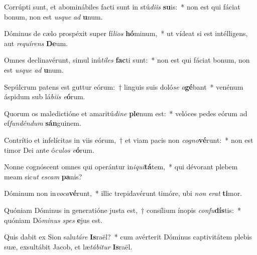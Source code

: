 \item Corrúpti sunt, et abominábiles facti sunt in stú\textit{di}\textit{is} \textbf{su}is:~* non est qui fáciat bonum, non est \textit{us}\textit{que} \textit{ad} \textbf{u}num.
\item Dóminus de cælo prospéxit super fí\textit{li}\textit{os} \textbf{hó}minum,~* ut vídeat si est intélligens, aut \textit{re}\textit{quí}\textit{rens} \textbf{De}um.
\item Omnes declinavérunt, simul inú\textit{ti}\textit{les} \textbf{fac}ti sunt:~* non est qui fáciat bonum, non est \textit{us}\textit{que} \textit{ad} \textbf{u}num.
\item Sepúlcrum patens est guttur eórum:~† linguis suis doló\textit{se} \textit{a}\textbf{gé}bant~* venénum áspidum sub lá\textit{bi}\textit{is} \textit{e}\textbf{ó}rum.
\item Quorum os maledictióne et amaritú\textit{di}\textit{ne} \textbf{ple}num est:~* velóces pedes eórum ad ef\textit{fun}\textit{dén}\textit{dum} \textbf{sán}guinem.
\item Contrítio et infelícitas in viis eórum,~† et viam pacis non \textit{co}\textit{gno}\textbf{vé}runt:~* non est timor Dei ante ó\textit{cu}\textit{los} \textit{e}\textbf{ó}rum.
\item Nonne cognóscent omnes qui operántur in\textit{i}\textit{qui}\textbf{tá}tem,~* qui dévorant plebem meam sic\textit{ut} \textit{es}\textit{cam} \textbf{pa}nis?
\item Dóminum non in\textit{vo}\textit{ca}\textbf{vé}runt,~* illic trepidavérunt timóre, ubi \textit{non} \textit{e}\textit{rat} \textbf{ti}mor.
\item Quóniam Dóminus in generatióne justa est,~† consílium ínopis \textit{con}\textit{fu}\textbf{dís}tis:~* quóniam Dó\textit{mi}\textit{nus} \textit{spes} \textbf{e}jus est.
\item Quis dabit ex Sion salu\textit{tá}\textit{re} \textbf{Is}raël?~* cum avérterit Dóminus captivitátem plebis suæ, exsultábit Jacob, et læ\textit{tá}\textit{bi}\textit{tur} \textbf{Is}raël.
